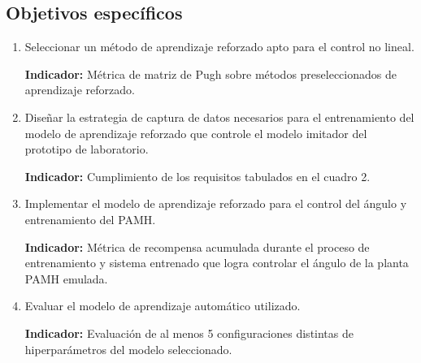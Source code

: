 \subsection{Objetivos específicos}

\begin{enumerate}
    \item Seleccionar un método de aprendizaje reforzado apto para el control no lineal.

\textbf{Indicador:} Métrica de matriz de Pugh sobre métodos preseleccionados de aprendizaje reforzado.

    \item Diseñar la estrategia de captura de datos necesarios para el entrenamiento del modelo de aprendizaje reforzado que controle el modelo imitador del prototipo de laboratorio.

\textbf{Indicador:} Cumplimiento de los requisitos tabulados en el cuadro 2.

    \item Implementar el modelo de aprendizaje reforzado para el control del ángulo y entrenamiento del PAMH.

\textbf{Indicador:} Métrica de recompensa acumulada durante el proceso de entrenamiento y sistema entrenado que logra controlar el ángulo de la planta PAMH emulada.

    \item Evaluar el modelo de aprendizaje automático utilizado.

\textbf{Indicador:} Evaluación de al menos 5 configuraciones distintas de hiperparámetros del modelo seleccionado.


\end{enumerate}


